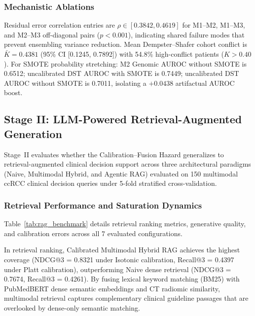 \subsubsection{Mechanistic Ablations}
Residual error correlation entries are $\rho \in [0.3842, 0.4619]$ for M1--M2, M1--M3, and M2--M3 off-diagonal pairs ($p < 0.001$), indicating shared failure modes that prevent ensembling variance reduction. Mean Dempster--Shafer cohort conflict is $\bar{K} = 0.4381$ (95\% CI [0.1245, 0.7892]) with 54.8\% high-conflict patients ($K > 0.40$). For SMOTE probability stretching: M2 Genomic AUROC without SMOTE is 0.6512; uncalibrated DST AUROC with SMOTE is 0.7449; uncalibrated DST AUROC without SMOTE is 0.7011, isolating a $+0.0438$ artifactual AUROC boost.


\subsection{Stage II: LLM-Powered Retrieval-Augmented Generation}
\label{sec:rag_results}

Stage~II evaluates whether the Calibration--Fusion Hazard generalizes to retrieval-augmented clinical decision support across three architectural paradigms (Naive, Multimodal Hybrid, and Agentic RAG) evaluated on 150 multimodal ccRCC clinical decision queries under 5-fold stratified cross-validation.

\subsubsection{Retrieval Performance and Saturation Dynamics}

Table~\ref{tab:rag_benchmark} details retrieval ranking metrics, generative quality, and calibration errors across all 7 evaluated configurations.

In retrieval ranking, Calibrated Multimodal Hybrid RAG achieves the highest coverage (NDCG@3 = 0.8321 under Isotonic calibration, Recall@3 = 0.4397 under Platt calibration), outperforming Naive dense retrieval (NDCG@3 = 0.7674, Recall@3 = 0.4261). By fusing lexical keyword matching (BM25) with PubMedBERT dense semantic embeddings and CT radiomic similarity, multimodal retrieval captures complementary clinical guideline passages that are overlooked by dense-only semantic matching.

